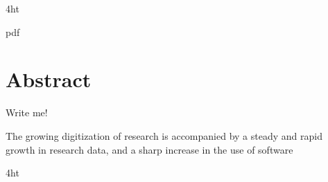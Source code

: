 \documentclass[
  a4paper,  %
  twoside,  %
  bibliography=totoc,
  headsepline,
  cleardoublepage=empty,
  parskip=half,
  draft=false
]{scrbook}
\begin{document}
\iftex4ht
  \Configure{$}{\PicMath}{\EndPicMath}{}

  {pdf}
  {%
  }
\fi



\Titelblatt

\pagestyle{preamble}
\renewcommand*{\chapterpagestyle}{preamble}



\section*{Abstract}


Write me!

The growing digitization of research is accompanied by a steady and rapid growth in research data, and a sharp increase in the use of software \citep{dfg}

\cleardoublepage



\iftex4ht
\else
\fi

%
%

%
%
%
\tableofcontents

\end{document}
